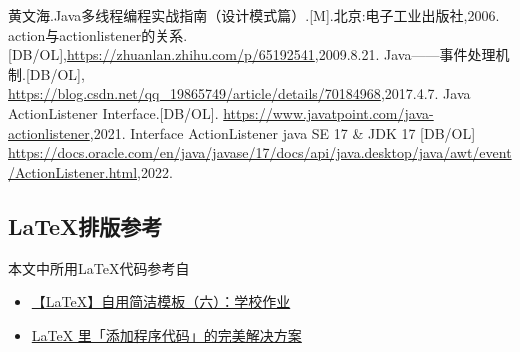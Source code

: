 \documentclass[12pt, a4paper, oneside]{ctexart}
\begin{document}
\newpage

\begin{thebibliography}{99}
    黄文海.Java多线程编程实战指南（设计模式篇）.[M].北京:电子工业出版社,2006.
    action与actionlistener的关系.[DB/OL],\newline \url{https://zhuanlan.zhihu.com/p/65192541},2009.8.21.
    Java——事件处理机制.[DB/OL],
        \newline \url{https://blog.csdn.net/qq_19865749/article/details/70184968},2017.4.7.
    Java ActionListener Interface.[DB/OL].
        \newline \url{https://www.javatpoint.com/java-actionlistener},2021.
    Interface ActionListener java SE 17 \& JDK 17 [DB/OL]\newline
        \url{https://docs.oracle.com/en/java/javase/17/docs/api/java.desktop/java/awt/event/ActionListener.html},2022.
\end{thebibliography}


\newpage

\begin{appendices}
    \renewcommand{\thesection}{\Alph{section}}
    \section{\LaTeX 排版参考}
        本文中所用\LaTeX 代码参考自
        \begin{itemize}
            \item  \href{https://zhuanlan.zhihu.com/p/385727082}{【LaTeX】自用简洁模板（六）：学校作业} 
            \item  \href{https://zhuanlan.zhihu.com/p/65441079}{LaTeX 里「添加程序代码」的完美解决方案}
        \end{itemize}
\end{appendices}
\end{document}

